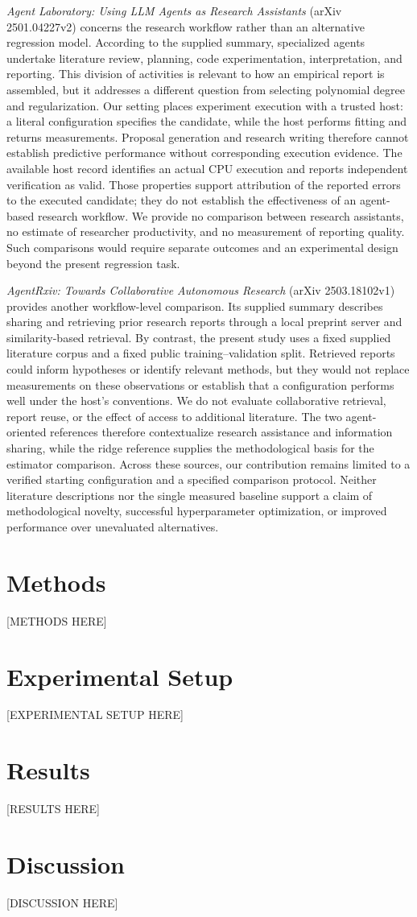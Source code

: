 \documentclass[11pt]{article}
\begin{document}
\textit{Agent Laboratory: Using LLM Agents as Research Assistants} (arXiv 2501.04227v2) concerns the research workflow rather than an alternative regression model. According to the supplied summary, specialized agents undertake literature review, planning, code experimentation, interpretation, and reporting. This division of activities is relevant to how an empirical report is assembled, but it addresses a different question from selecting polynomial degree and regularization. Our setting places experiment execution with a trusted host: a literal configuration specifies the candidate, while the host performs fitting and returns measurements. Proposal generation and research writing therefore cannot establish predictive performance without corresponding execution evidence. The available host record identifies an actual CPU execution and reports independent verification as valid. Those properties support attribution of the reported errors to the executed candidate; they do not establish the effectiveness of an agent-based research workflow. We provide no comparison between research assistants, no estimate of researcher productivity, and no measurement of reporting quality. Such comparisons would require separate outcomes and an experimental design beyond the present regression task.

\textit{AgentRxiv: Towards Collaborative Autonomous Research} (arXiv 2503.18102v1) provides another workflow-level comparison. Its supplied summary describes sharing and retrieving prior research reports through a local preprint server and similarity-based retrieval. By contrast, the present study uses a fixed supplied literature corpus and a fixed public training--validation split. Retrieved reports could inform hypotheses or identify relevant methods, but they would not replace measurements on these observations or establish that a configuration performs well under the host's conventions. We do not evaluate collaborative retrieval, report reuse, or the effect of access to additional literature. The two agent-oriented references therefore contextualize research assistance and information sharing, while the ridge reference supplies the methodological basis for the estimator comparison. Across these sources, our contribution remains limited to a verified starting configuration and a specified comparison protocol. Neither literature descriptions nor the single measured baseline support a claim of methodological novelty, successful hyperparameter optimization, or improved performance over unevaluated alternatives.

\section{Methods}
[METHODS HERE]

\section{Experimental Setup}
[EXPERIMENTAL SETUP HERE]

\section{Results}
[RESULTS HERE]

\section{Discussion}
[DISCUSSION HERE]
\end{document}
